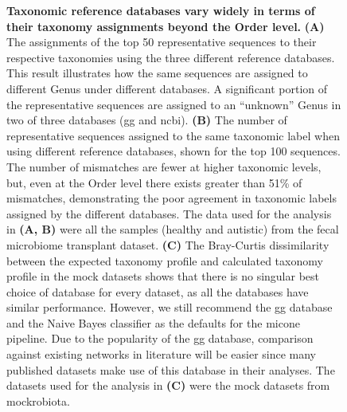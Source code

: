   \FloatBarrier
  \newpage
  \begin{figure}[H]
    \centering
    \caption{
      \textbf{Taxonomic reference databases vary widely in terms of their taxonomy assignments beyond the Order level.}
      \textbf{(A)} The assignments of the top 50 representative sequences to their respective taxonomies using the three different reference databases.
      This result illustrates how the same sequences are assigned to different Genus under different databases.
      A significant portion of the representative sequences are assigned to an ``unknown'' Genus in two of three databases (\ac{gg} and \ac{ncbi}).
      \textbf{(B)} The number of representative sequences assigned to the same taxonomic label when using different reference databases, shown for the top 100 sequences.
      The number of mismatches are fewer at higher taxonomic levels, but, even at the Order level there exists greater than 51\% of mismatches, demonstrating the poor agreement in taxonomic labels assigned by the different databases.
      The data used for the analysis in \textbf{(A, B)} were all the samples (healthy and autistic) from the fecal microbiome transplant dataset.
      \textbf{(C)} The Bray-Curtis dissimilarity between the expected taxonomy profile and calculated taxonomy profile in the mock datasets shows that there is no singular best choice of database for every dataset, as all the databases have similar performance.
      However, we still recommend the \ac{gg} database and the Naive Bayes classifier as the defaults for the \ac{micone} pipeline.
      Due to the popularity of the \ac{gg} database, comparison against existing networks in literature will be easier since many published datasets make use of this database in their analyses.
      The datasets used for the analysis in \textbf{(C)} were the mock datasets from mockrobiota.
    }
    \label{fig:figure3}
  \end{figure}


